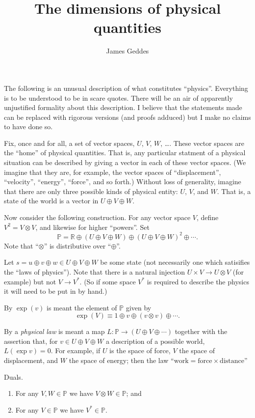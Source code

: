 \documentclass[a4paper, twocolumn, 10pt]{article}
\title{The dimensions of physical quantities}
\author{James Geddes}
\newcommand{\physics}{\mathbb{P}}
\newcommand{\reals}{\mathbb{R}}
\begin{document}
\maketitle

The following is an unusual description of what constitutes
``physics''. Everything is to be understood to be in scare quotes. There will be an
air of apparently unjustified formality about this description. I believe that
the statements made can be replaced with rigorous versions (and proofs adduced)
but I make no claims to have done so.

Fix, once and for all, a set of vector spaces, $U$, $V$, $W$, \ldots. These
vector spaces are the ``home'' of physical quantities. That is, any particular
statment of a physical situation can be described by giving a vector in each of
these vector spaces. (We imagine that they are, for example, the vector spaces
of ``displacement'', ``velocity'', ``energy'', ``force'', and so forth.) Without
loss of generality, imagine that there are only three possible kinds of physical
entity: $U$, $V$, and $W$. That is, a state of the world is a vector in $U\oplus
V\oplus W$.

Now consider the following construction. For any vector space $V$, define
$V^2=V\otimes V$, and likewise for higher ``powers''. Set
\[
\physics = \reals \oplus (U\oplus V\oplus W) \oplus (U\oplus V\oplus W)^2
\oplus \dotsb.
\]
Note that ``$\otimes$'' is distributive over ``$\oplus$''. 

Let $s= u\oplus v\oplus w\in U\oplus V\oplus W$ be some state (not necessarily
one which satisifies the ``laws of physics''). Note that there is a natural
injection $U\times V \to U\otimes V$ (for example) but not $V\to V^*$. (So if
some space $V^*$ is required to describe the physics it will need to be put in
by hand.)

By $\exp(v)$ is meant the element of $\physics$ given by
\[
\exp(V) \equiv 1\oplus
v\oplus (v\otimes v) \oplus \dotsb .
\] 

By a \emph{physical law} is meant a map $L:\physics\to(U\oplus V\oplus\dotsb)$
together with the assertion that, for $v\in U\oplus V\oplus W$ a description of
a possible world, $L(\exp v)=0$. For example, if $U$ is the space of force, $V$ the
space of displacement, and $W$ the space of energy; then the law ``$\text{work}
= \text{force}\times\text{distance}$''

Duals.


\begin{enumerate}
\item For any $V, W\in\physics$ we have $V\otimes W\in\physics$; and
\item For any $V\in\physics$ we have $V^*\in\physics$.
\end{enumerate}
\end{document}
